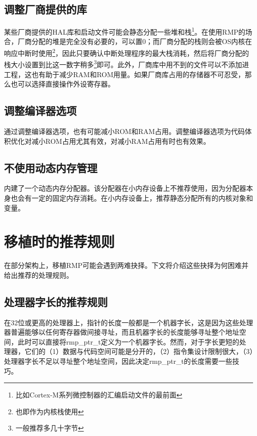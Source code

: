 \subsection{调整厂商提供的库}\label{subsec:adjusting-the-vendor-provided-library}

某些厂商提供的HAL库和启动文件可能会静态分配一些堆和栈\footnote{比如Cortex-M系列微控制器的汇编启动文件的最前面}。在使用RMP的场合，厂商分配的堆是完全没有必要的，可以置0；而厂商分配的栈则会被OS内核在响应中断时使用\footnote{也即作为内核栈使用}，因此只要确认中断处理程序的最大栈消耗，然后将厂商分配的栈大小设置到比这一数字稍多\footnote{一般推荐多几十字节}即可。此外，厂商库中用不到的文件可以不添加进工程，这也有助于减少RAM和ROM用量。如果厂商库占用的存储器不可忍受，那么也可以选择直接操作外设寄存器。

\subsection{调整编译器选项}\label{subsec:adjusting-compiler-options}

通过调整编译器选项，也有可能减小ROM和RAM占用。调整编译器选项为代码体积优化对减小ROM占用尤其有效，对减小RAM占用有时也有效果。

\subsection{不使用动态内存管理}\label{subsec:not-using-dynamic-memory-management}

内建了一个动态内存分配器。该分配器在小内存设备上不推荐使用，因为分配器本身也会有一定的固定内存消耗。在小内存设备上，推荐静态分配所有的内核对象和变量。

\section{移植时的推荐规则}\label{sec:recommended-rules-for-porting}

在部分架构上，移植RMP可能会遇到两难抉择。下文将介绍这些抉择为何困难并给出推荐的处理规则。

\subsection{处理器字长的推荐规则}\label{subsec:recommended-rules-for-processor-word-length}

在32位或更高的处理器上，指针的长度一般都是一个机器字长，这是因为这些处理器普遍能够以任何寄存器做间接寻址，而且机器字长的长度能够寻址整个地址空间，此时可以直接将rmp\_ptr\_t定义为一个机器字长。然而，对于字长更短的处理器，它们的（1）数据与代码空间可能是分开的，（2）指令集设计限制很大，（3）处理器字长不足以寻址整个地址空间，因此决定rmp\_ptr\_t的长度需要一些技巧。

